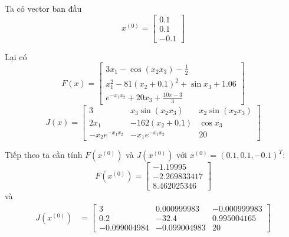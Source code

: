 Ta có vector ban đầu
\[
x^{(0)} = \begin{bmatrix} 0.1 \\ 0.1 \\ -0.1 \end{bmatrix}
\]

Lại có
\[
F(x) = \begin{bmatrix}
3x_{1} - \cos(x_{2}x_{3}) - \frac{1}{2} \\
x_{1}^{2} - 81(x_{2} + 0.1)^{2} + \sin x_{3} + 1.06 \\
e^{-x_{1}x_{2}} + 20x_{3} + \frac{10\pi - 3}{3}
\end{bmatrix}
\]
\[
J(x) = \begin{bmatrix}
3 & x_{3}\sin(x_{2}x_{3}) & x_{2}\sin(x_{2}x_{3}) \\
2x_{1} & -162(x_{2} + 0.1) & \cos x_{3} \\
-x_{2}e^{-x_{1}x_{2}} & -x_{1}e^{-x_{1}x_{2}} & 20
\end{bmatrix}
\]

Tiếp theo ta cần tính $F(x^{(0)})$ và $J(x^{(0)})$ với $x^{(0)} = (0.1, 0.1, -0.1)^{T}$:
\[
F(x^{(0)}) 
= \begin{bmatrix}
-1.19995 \\
-2.269833417 \\
8.462025346
\end{bmatrix}
\]
và
\begin{align*}
J(x^{(0)}) 
&= \begin{bmatrix}
3 & 0.000999983 & -0.000999983 \\
0.2 & -32.4 & 0.995004165 \\
-0.099004984 & -0.099004983 & 20
\end{bmatrix}
\end{align*}


